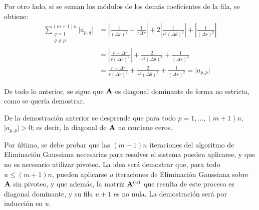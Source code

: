 \begin{enumerate}[label=(\roman*)]
            Por otro lado, si se suman los módulos de los demás coeficientes de la fila, se obtiene:
                \[ \begin{split}
                    \sum_{\substack{q=1 \\ q \neq p}}^{(m+1)n} \vert a_{p,q} \vert &= \left \vert \frac{1}{(\Delta r)^2} - \frac{1}{r \Delta r} \right \vert + 2 \left \vert \frac{1}{r^2 (\Delta \theta)^2} \right \vert + \left \vert \frac{1}{(\Delta r)^2} \right \vert \\
                    &= \left \vert \frac{r - \Delta r}{r (\Delta r)^2} \right \vert + \frac{2}{r^2 (\Delta \theta)^2} + \frac{1}{(\Delta r)^2} \\
                    &= \frac{r - \Delta r}{r (\Delta r)^2} + \frac{2}{r^2 (\Delta \theta)^2} + \frac{1}{(\Delta r)^2} = \vert a_{p,p} \vert
                \end{split} \]
        \end{enumerate}

        De todo lo anterior, se sigue que $\mathbf{A}$ es diagonal dominante de forma no estricta, como se quería demostrar.

        \begin{obs} \label{obs:Diagonal de A sin ceros}
        De la demostración anterior se desprende que para todo $p = 1, \dots, (m+1)n$, $\vert a_{p,p} \vert > 0$; es decir, la diagonal de $\mathbf{A}$ no contiene ceros.
        \end{obs}

        Por último, se debe probar que las $(m+1)n$ iteraciones del algoritmo de Eliminación Gaussiana necesarias para resolver el sistema pueden aplicarse, y que no es necesario utilizar pivoteo. La idea será demostrar que, para todo $u \leq (m+1)n$, pueden aplicarse $u$ iteraciones de Eliminación Gaussiana sobre $\mathbf{A}$ sin pivoteo, y que además, la matriz $\mathbf{A}^{(u)}$ que resulta de este proceso es diagonal dominante, y su fila $u + 1$ es no nula. La demostración será por inducción en $u$.

